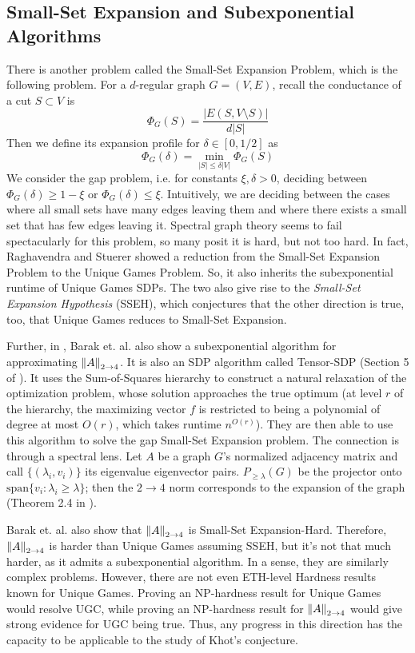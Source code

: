 \documentclass[10pt]{article}
\newcommand{\ATF}{\norm{A}_{2 \to 4}}
\begin{document}
\subsection{Small-Set Expansion and Subexponential Algorithms}
There is another problem called the Small-Set Expansion Problem, which is the following problem. For a $d$-regular graph $G = (V, E)$, recall the conductance of a cut $S \subset V$ is
\[ \Phi_G(S) = \frac{|E(S, V\setminus S)|}{d |S|} \]
Then we define its expansion profile for $\delta \in [0, 1/2]$ as
\[ \Phi_G(\delta) = \min_{|S| \leq \delta |V|} \Phi_G(S) \]
We consider the gap problem, i.e. for constants $\xi, \delta > 0$, deciding between $\Phi_G(\delta) \geq 1 - \xi$ or $\Phi_G(\delta) \leq \xi$. Intuitively, we are deciding between the cases where all small sets have many edges leaving them and where there exists a small set that has few edges leaving it.
Spectral graph theory seems to fail spectacularly for this problem, so many posit it is hard, but not too hard. In fact, Raghavendra and Stuerer \cite{smallsetexp} showed a reduction from the Small-Set Expansion Problem to the Unique Games Problem. So, it also inherits the subexponential runtime of Unique Games SDPs. The two also give rise to the \textit{Small-Set Expansion Hypothesis} (SSEH), which conjectures that the other direction is true, too, that Unique Games reduces to Small-Set Expansion.

Further, in \cite{Barak}, Barak et. al. also show a subexponential algorithm for approximating $\ATF$. It is also an SDP algorithm called Tensor-SDP (Section 5 of \cite{Barak}). It uses the Sum-of-Squares hierarchy to construct a natural relaxation of the optimization problem, whose solution approaches the true optimum (at level $r$ of the hierarchy, the maximizing vector $f$ is restricted to being a polynomial of degree at most $O(r)$, which takes runtime $n^{O(r)}$). They are then able to use this algorithm to solve the gap Small-Set Expansion problem. The connection is through a spectral lens. Let $A$ be a graph $G$'s normalized adjacency matrix and call $\{(\lambda_i, v_i)\}$ its eigenvalue eigenvector pairs. $P_{\geq \lambda}(G)$ be the projector onto $\textrm{span}\{v_i : \lambda_i \geq \lambda\}$; then the $2 \to 4$ norm corresponds to the expansion of the graph (Theorem 2.4 in \cite{Barak}).

Barak et. al. also show that $\ATF$ is Small-Set Expansion-Hard. Therefore, $\ATF$ is harder than Unique Games assuming SSEH, but it's not that much harder, as it admits a subexponential algorithm. In a sense, they are similarly complex problems. However, there are not even ETH-level Hardness results known for Unique Games. Proving an NP-hardness result for Unique Games would resolve UGC, while proving an NP-hardness result for $\norm{A}_{2 \to 4}$ would give strong evidence for UGC being true. Thus, any progress in this direction has the capacity to be applicable to the study of Khot's conjecture.
\end{document}
